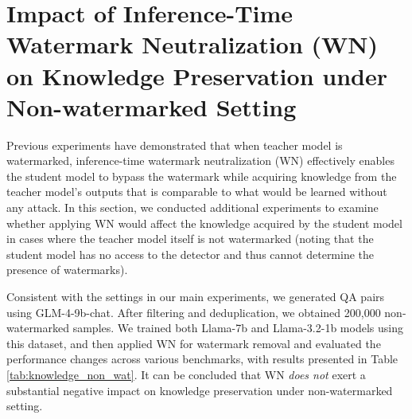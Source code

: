 \section{Impact of Inference-Time Watermark Neutralization (WN) on Knowledge Preservation under Non-watermarked Setting}
Previous experiments have demonstrated that when teacher model is watermarked, inference-time watermark neutralization (WN) effectively enables the student model to bypass the watermark while acquiring knowledge from the teacher model's outputs that is comparable to what would be learned without any attack. In this section, we conducted additional experiments to examine whether applying WN would affect the knowledge acquired by the student model in cases where the teacher model itself is not watermarked (noting that the student model has no access to the detector and thus cannot determine the presence of watermarks).

Consistent with the settings in our main experiments, we generated QA pairs using GLM-4-9b-chat. After filtering and deduplication, we obtained 200,000 non-watermarked samples. We trained both Llama-7b and Llama-3.2-1b models using this dataset, and then applied WN for watermark removal and evaluated the performance changes across various benchmarks, with results presented in Table \ref{tab:knowledge_non_wat}. It can be concluded that WN \textit{does not} exert a substantial negative impact on knowledge preservation under non-watermarked setting.



